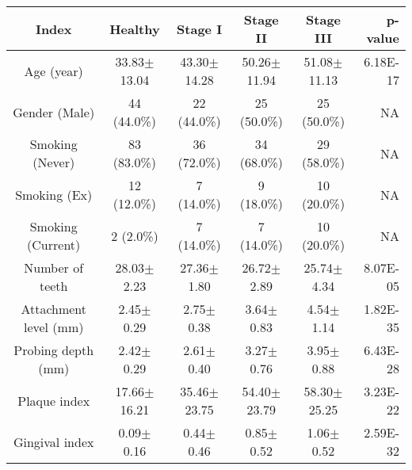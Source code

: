 \begin{tabular}{c|ccccr}
    \textbf{Index} & \textbf{Healthy} & \textbf{Stage I} & \textbf{Stage II} & \textbf{Stage III} & \textbf{p-value} \\
    \hline
    Age (year) & 33.83$\pm$13.04 & 43.30$\pm$14.28 & 50.26$\pm$11.94 & 51.08$\pm$11.13 & 6.18E-17 \\
    Gender (Male) & 44 (44.0\%) & 22 (44.0\%) & 25 (50.0\%) & 25 (50.0\%) & NA \\
    Smoking (Never) & 83 (83.0\%) & 36 (72.0\%) & 34 (68.0\%) & 29 (58.0\%) & NA \\
    Smoking (Ex) & 12 (12.0\%) & 7 (14.0\%) & 9 (18.0\%) & 10 (20.0\%) & NA \\
    Smoking (Current) & 2 (2.0\%) & 7 (14.0\%) & 7 (14.0\%) & 10 (20.0\%) & NA \\
    Number of teeth & 28.03$\pm$2.23 & 27.36$\pm$1.80 & 26.72$\pm$2.89 & 25.74$\pm$4.34 & 8.07E-05 \\
    Attachment level (mm) & 2.45$\pm$0.29 & 2.75$\pm$0.38 & 3.64$\pm$0.83 & 4.54$\pm$1.14 & 1.82E-35 \\
    Probing depth (mm) & 2.42$\pm$0.29 & 2.61$\pm$0.40 & 3.27$\pm$0.76 & 3.95$\pm$0.88 & 6.43E-28 \\
    Plaque index & 17.66$\pm$16.21 & 35.46$\pm$23.75 & 54.40$\pm$23.79 & 58.30$\pm$25.25 & 3.23E-22 \\
    Gingival index & 0.09$\pm$0.16 & 0.44$\pm$0.46 & 0.85$\pm$0.52 & 1.06$\pm$0.52 & 2.59E-32 \\
\end{tabular}
